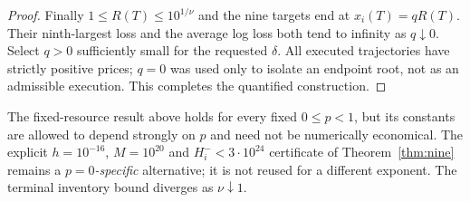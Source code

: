 \documentclass[review,hidelinks,onefignum,onetabnum]{siamonline250211}%
\begin{document}
\begin{proof}
Finally $1\le R(T)\le10^{1/\nu}$ and the nine targets
end at $x_i(T)=qR(T)$. Their ninth-largest loss and the
average log loss both tend to infinity as $q\downarrow0$.
Select $q>0$ sufficiently small for the requested $\delta$.
All executed trajectories have strictly positive prices;
$q=0$ was used only to isolate an endpoint root, not as an
admissible execution. This completes the quantified construction.
\end{proof}

\begin{remark}[The distinction from the explicit $p=0$ witness]
The fixed-resource result above holds for every fixed
$0\le p<1$, but its constants are allowed to depend strongly
on $p$ and need not be numerically economical. The explicit
$h=10^{-16}$, $M=10^{20}$ and $H_i^-<3\cdot10^{24}$
certificate of Theorem~\ref{thm:nine} remains a
\emph{$p=0$-specific} alternative; it is not reused for a
different exponent. The terminal inventory bound diverges as
$\nu\downarrow1$.
\end{remark}
\end{document}
